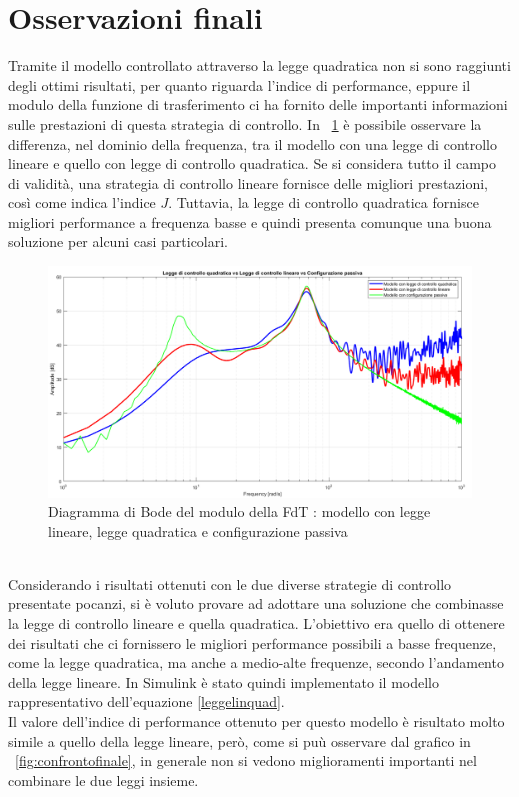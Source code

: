 \section{Osservazioni finali}
Tramite il modello controllato attraverso la legge quadratica non si sono raggiunti degli ottimi risultati, per quanto riguarda l'indice di performance, eppure il modulo della funzione di trasferimento ci ha fornito delle importanti informazioni sulle prestazioni di questa strategia di controllo. 
In \figurename \ \ref{fig:confrontolinquad} è possibile osservare la differenza, nel dominio della frequenza, tra il modello con una legge di controllo lineare e quello con legge di controllo quadratica. Se si considera tutto il campo di validità, una strategia di controllo lineare fornisce delle migliori prestazioni, così come indica l'indice $J$. Tuttavia, la legge di controllo quadratica fornisce migliori performance a frequenza basse e quindi presenta comunque una buona soluzione per alcuni casi particolari.\\
\begin{figure}[htb]
	\centering
	\includegraphics[scale=0.4]{figure/confrontoPas-Lin-Quad.png}
	\caption{Diagramma di Bode del modulo della FdT : modello con legge lineare, legge quadratica e configurazione passiva}
	\label{fig:confrontolinquad}
\end{figure}\\

\newpage
Considerando i risultati ottenuti con le due diverse strategie di controllo presentate pocanzi, si è voluto provare ad adottare una soluzione che combinasse la legge di controllo lineare e quella quadratica. L'obiettivo era quello di ottenere dei risultati che ci fornissero le migliori performance possibili a basse frequenze, come la legge quadratica, ma anche a medio-alte frequenze, secondo l'andamento della legge lineare. In Simulink è stato quindi implementato il modello rappresentativo dell'equazione \eqref{leggelinquad}.\\
Il valore dell'indice di performance ottenuto per questo modello è risultato molto simile a quello della legge lineare, però, come si puù osservare dal grafico in \figurename \ \ref{fig:confrontofinale}, in generale non si vedono miglioramenti importanti nel combinare le due leggi insieme.

